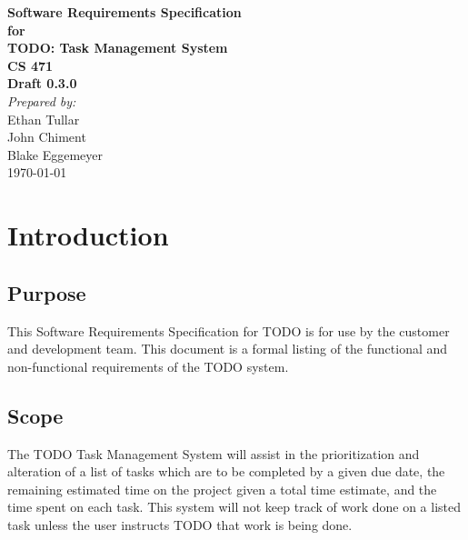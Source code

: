 \documentclass[12pt,a4paper]{article}
\begin{document}
\begin{titlepage}
\begin{flushright} 
{\LARGE \bfseries Software Requirements Specification}\\[1.2cm]
{\large \bfseries for}\\[1.2cm]
{\huge \bfseries TODO: Task Management System}\\[1.2cm]
{\large \bfseries CS 471}\\
\vfill
{\large \bfseries Draft 0.3.0}\\[2cm]
\emph{Prepared by:} \\
Ethan Tullar\\
John Chiment\\
Blake Eggemeyer \\ [3cm]
{\large \today}
\end{flushright}
\end{titlepage}
\setcounter{tocdepth}{3}
\setcounter{secnumdepth}{4}
\tableofcontents
\newpage
\section{Introduction}
\subsection{Purpose}
This Software Requirements Specification for TODO is for use by the customer and development team. This document is a formal listing of the functional and non-functional requirements of the TODO system.
\subsection{Scope}
The TODO Task Management System will assist in the prioritization and alteration of a list of tasks which are to be completed by a given due date, the remaining estimated time on the project given a total time estimate, and the time spent on each task. This system will not keep track of work done on a listed task unless the user instructs TODO that work is being done.
\end{document}

